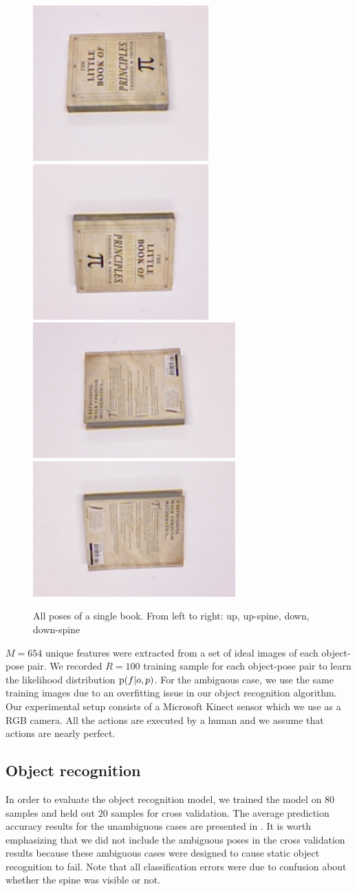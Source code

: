     \begin{figure}[h]
        \centering
        \includegraphics[width = 0.2\columnwidth]{pics/math_cover1.jpg}
        \includegraphics[width = 0.2\columnwidth]{pics/math_cover1_rot.jpg}
        \includegraphics[width = 0.2\columnwidth]{pics/math_down.jpg}
        \includegraphics[width = 0.2\columnwidth]{pics/math_down_rot.jpg}
        \caption{All poses of a single book. From left to right: up, up-spine, down, down-spine} %
    \label{fig:pose_dataset}
    \end{figure}

    $M = 654$ unique features were extracted from a set of ideal images of each object-pose pair. We recorded $R = 100$ training sample for each object-pose pair to learn the likelihood distribution $\text{p}(f|o,p)$. For the ambiguous case, we use the same training images due to an overfitting issue in our object recognition algorithm. Our experimental setup consists of a Microsoft Kinect sensor which we use as a RGB camera. All the actions are executed by a human and we assume that actions are nearly perfect. 

    \subsection{Object recognition}
        In order to evaluate the object recognition model, we trained the model on $80$ samples and held out $20$ samples for cross validation. The average prediction accuracy results for the unambiguous cases are presented in . It is worth emphasizing that we did not include the ambiguous poses in the cross validation results because these ambiguous cases were designed to cause static object recognition to fail. Note that all classification errors were due to confusion about whether the spine was visible or not.
        

